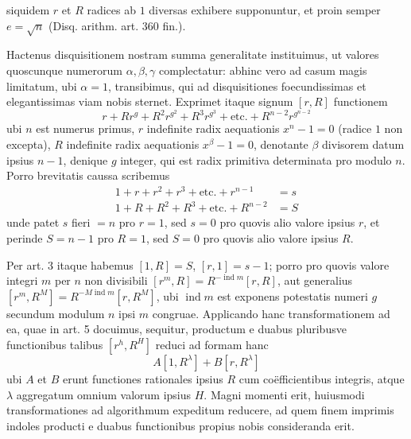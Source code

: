 %
siquidem $r$ et $R$ radices ab $1$ diversas exhibere supponuntur, et proin semper $e=\surd n$ (Disq. arithm. art. 360 fin.).

Hactenus disquisitionem nostram summa generalitate instituimus, ut valores quoscunque numerorum $\alpha,\beta,\gamma$ complectatur: abhinc vero ad casum magis limitatum, ubi $\alpha=1$, transibimus, qui ad disquisitiones foecundissimas et elegantissimas viam nobis sternet. Exprimet itaque signum $[r,R]$ functionem
\[
r+Rr^g+R^2r^{g^2}+R^3r^{g^3}+\text{etc.}+R^{n-2}r^{g^{n-2}}
\]
ubi $n$ est numerus primus, $r$ indefinite radix aequationis $x^n-1=0$ (radice $1$ non excepta), $R$ indefinite radix aequationis $x^\beta-1=0$, denotante $\beta$ divisorem datum ipsius $n-1$, denique $g$ integer, qui est radix primitiva determinata pro modulo $n$. Porro brevitatis caussa scribemus
\[
\begin{aligned}
1+r+r^2+r^3+\text{etc.}+r^{n-1}&=s\\
1+R+R^2+R^3+\text{etc.}+R^{n-2}&=S
\end{aligned}
\]
unde patet $s$ fieri $=n$ pro $r=1$, sed $s=0$ pro quovis alio valore ipsius $r$, et perinde $S=n-1$ pro $R=1$, sed $S=0$ pro quovis alio valore ipsius $R$.

Per art. 3 itaque habemus $[1,R]=S$, $[r,1]=s-1$; porro pro quovis valore integri $m$ per $n$ non divisibili $[r^m,R]=R^{-\operatorname{ind}m}[r,R]$, aut generalius $[r^m,R^M]=R^{-M\operatorname{ind}m}[r,R^M]$, ubi $\operatorname{ind}m$ est exponens potestatis numeri $g$ secundum modulum $n$ ipsi $m$ congruae. Applicando hanc transformationem ad ea, quae in art. 5 docuimus, sequitur, productum e duabus pluribusve functionibus talibus $[r^h,R^H]$ reduci ad formam hanc
\[
A[1,R^\lambda]+B[r,R^\lambda]
\]
ubi $A$ et $B$ erunt functiones rationales ipsius $R$ cum coëfficientibus integris, atque $\lambda$ aggregatum omnium valorum ipsius $H$. Magni momenti erit, huiusmodi transformationes ad algorithmum expeditum reducere, ad quem finem imprimis indoles producti e duabus functionibus propius nobis consideranda erit.

